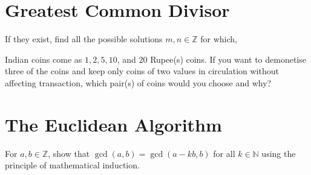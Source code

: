 \documentclass[12pt]{exam}
\begin{document}
\section{Greatest Common Divisor}
\begin{questions}
\question If they exist, find all the possible solutions $m, n \in \mathbb{Z}$ for which,
\question Indian coins come as $1, 2, 5, 10$, and $20$ Rupee(s) coins. If you want to demonetise three of the coins and keep only coins of two values in circulation without affecting transaction, which pair(s) of coins would you choose and why? 
\end{questions}

\section{The Euclidean Algorithm}
\begin{questions}
    \question For $a, b \in \mathbb{Z}$, show that $\gcd(a, b) = \gcd(a - kb, b)$ for all $k \in \mathbb{N}$ using the principle of mathematical induction.
\end{questions}
\end{document}
